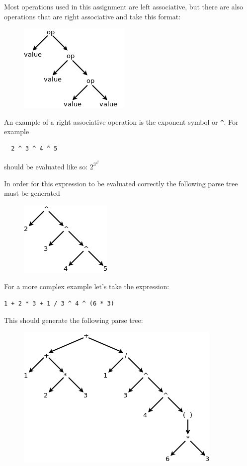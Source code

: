 \documentclass{article}
\newcommand{\code}[1]{\texttt{\textmd{#1}}}
\begin{document}
Most operations used in this assignment are left associative, but there are also operations that
are right associative and take this format:
\begin{figure}[H]
  \centering
  \includegraphics{static/right-assoc-gen.png}
\end{figure}

An example of a right associative operation is the exponent symbol or \code{\textasciicircum}.
For example
\begin{lstlisting}
  2 ^ 3 ^ 4 ^ 5
\end{lstlisting}

should be evaluated like so:
\begin{math}
  2 ^ {\displaystyle 3 ^ {\displaystyle 4 ^ {\displaystyle 5 }}}
\end{math}

In order for this expression to be evaluated correctly the following parse tree must be generated
\begin{figure}[H]
  \centering
  \includegraphics{static/right-assoc-pow.png}
\end{figure}

For a more complex example let's take the expression:
\begin{lstlisting}
1 + 2 * 3 + 1 / 3 ^ 4 ^ (6 * 3)
\end{lstlisting}

This should generate the following parse tree:
\begin{figure}[H]
  \centering
  \includegraphics{static/assoc-example.png}
\end{figure}
\end{document}
